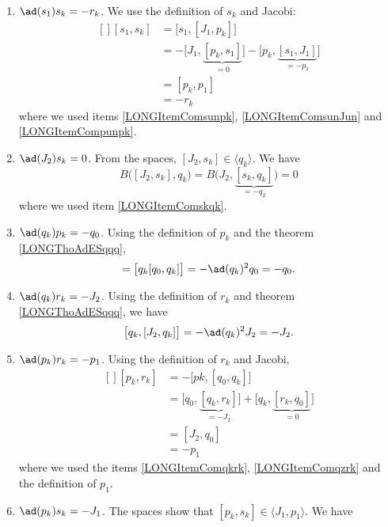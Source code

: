 \begin{enumerate}
	\item$\ad(s_1)s_k=-r_k$\label{LONGItemComsunsk}. We use the definition of $s_k$ and Jacobi:
		\begin{equation}
			\begin{aligned}[]
				[s_1,s_k]&=\big[ s_1,[J_1,p_k] \big]\\
				&=-\big[ J_1,\underbrace{[p_k,s_1]}_{=0} \big]-\big[ p_k,\underbrace{[s_1,J_1]}_{=-p_1} \big]\\
					&=[p_k,p_1]\\
					&=-r_k
			\end{aligned}
		\end{equation}
		where we used items \ref{LONGItemComsunpk}, \ref{LONGItemComsunJun} and \ref{LONGItemCompunpk}.
	\item$\ad(J_2)s_k=0$. From the spaces, $[J_2,s_k]\in\langle q_k\rangle$. We have
		\begin{equation}
			B\big( [J_2,s_k],q_k \big)=B\big( J_2,\underbrace{[s_k,q_k]}_{=-q_2} \big)=0
		\end{equation}
		where we used item \ref{LONGItemComskqk}.
	\item$\ad(q_k)p_k=-q_0$. Using the definition of $p_k$ and the theorem \ref{LONGThoAdESqqq},
		\begin{equation}
			[q_k,p_k]=\big[ q_k[q_0,q_k] \big]=-\ad(q_k)^2q_0=-q_0.
		\end{equation}
	\item$\ad(q_k)r_k=-J_2$\label{LONGItemComqkrk}. Using the definition of $r_k$ and theorem \ref{LONGThoAdESqqq}, we have
		\begin{equation}
			\big[ q_k,[J_2,q_k] \big]=-\ad(q_k)^2J_2=-J_2.
		\end{equation}
	\item$\ad(p_k)r_k=-p_1$. Using the definition of $r_k$ and Jacobi,
		\begin{equation}
			\begin{aligned}[]
				[p_k,r_k]&=-\big[ pk,[q_0,q_k] \big]\\
				&=\big[ q_0,\underbrace{[q_k,r_k]}_{=-J_2} \big]+\big[ q_k,\underbrace{[r_k,q_0]}_{=0} \big]\\
					&=[J_2,q_0]\\
					&=-p_1
			\end{aligned}
		\end{equation}
		where we used the items \ref{LONGItemComqkrk}, \ref{LONGItemComqzrk} and the definition of $p_1$.
	\item$\ad(p_k)s_k=-J_1$. The spaces show that $[p_k,s_k]\in\langle J_1,p_1\rangle$. We have

\end{enumerate}
